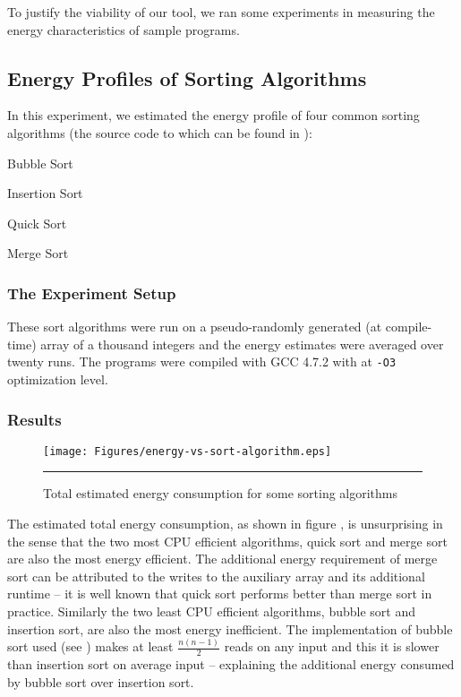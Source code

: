 To justify the viability of our tool, we ran some experiments in
measuring the energy characteristics of sample programs.

\subsection{Energy Profiles of Sorting Algorithms}

In this experiment, we estimated the energy profile of four common
sorting algorithms (the source code to which can be found in
):

\begin{itemize*}
\item Bubble Sort
\item Insertion Sort
\item Quick Sort
\item Merge Sort
\end{itemize*}

\subsubsection{The Experiment Setup}

These sort algorithms were run on a pseudo-randomly generated (at
compile-time) array of a thousand integers and the energy estimates
were averaged over twenty runs.  The programs were compiled with GCC
4.7.2 with at \texttt{-O3} optimization level.

\subsubsection{Results}

\begin{figure}[htbp]
  \centering
  \texttt{[image: Figures/energy-vs-sort-algorithm.eps]}
  \rule{35em}{0.5pt}
  \caption{Total estimated energy consumption for some sorting algorithms}
  \label{fig:total-energy-sort-algo}
\end{figure}

The estimated total energy consumption, as shown in figure
, is unsurprising in the sense that
the two most CPU efficient algorithms, quick sort and merge sort are
also the most energy efficient.  The additional energy requirement of
merge sort can be attributed to the writes to the auxiliary array and
its additional runtime -- it is well known that quick sort performs
better than merge sort in practice.  Similarly the two least CPU
efficient algorithms, bubble sort and insertion sort, are also the
most energy inefficient.  The implementation of bubble sort used (see
) makes at least $\frac{n (n - 1)}{2}$
reads on any input and this it is slower than insertion sort on
average input -- explaining the additional energy consumed by bubble
sort over insertion sort.

